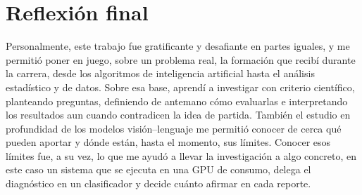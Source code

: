 \section{Reflexión final}
\label{sec:concl_reflexion}

Personalmente, este trabajo fue gratificante y desafiante en partes iguales, y me permitió poner en juego, sobre un
problema real, la formación que recibí durante la carrera, desde los algoritmos de inteligencia artificial hasta el
análisis estadístico y de datos. Sobre esa base, aprendí a investigar con criterio científico, planteando preguntas,
definiendo de antemano cómo evaluarlas e interpretando los resultados aun cuando contradicen la idea de partida.
También el estudio en profundidad de los modelos visión--lenguaje me permitió conocer de cerca qué pueden aportar y
dónde están, hasta el momento, sus límites. Conocer esos límites fue, a su vez, lo que me ayudó a llevar la
investigación a algo concreto, en este caso un sistema que se ejecuta en una GPU de consumo, delega el diagnóstico en
un clasificador y decide cuánto afirmar en cada reporte.
